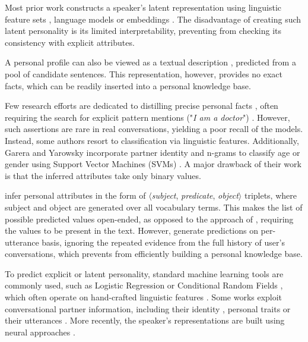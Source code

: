 Most prior work constructs a speaker's latent representation using linguistic feature sets \cite{AIIDElin11, jing-kambhatla-roukos:2007:ACLMain, garera-yarowsky:2009:ACLIJCNLP}, language models \cite{song2019learning} or embeddings \cite{luo2019learning, li2016persona}. The disadvantage of creating such latent personality is its limited interpretability, preventing from checking its consistency with explicit attributes.

A personal profile can also be viewed as a textual description \cite{zhang2018personalizing}, predicted from a pool of candidate sentences. This representation, however, provides no exact facts, which can be readily inserted into a personal knowledge base.

Few research efforts are dedicated to distilling precise personal facts \cite{dial7, welch2019look, garera-yarowsky:2009:ACLIJCNLP}, often requiring the search for explicit pattern mentions ("\textit{I am a doctor}") \cite{dial7}. However, such assertions are rare in real conversations, yielding a poor recall of the models. Instead, some authors resort to classification \cite{AIIDElin11, garera-yarowsky:2009:ACLIJCNLP} via linguistic features. Additionally, Garera and Yarowsky incorporate partner identity and n-grams to classify age or gender using Support Vector Machines (SVMs) \cite{garera-yarowsky:2009:ACLIJCNLP}. A major drawback of their work is that the inferred attributes take only binary values.

\citet{wu2019getting} infer personal attributes in the form of $\langle$\textit{subject}, \textit{predicate}, \textit{object}$\rangle$ triplets, where subject and object are generated over all vocabulary terms. This makes the list of possible predicted values open-ended, as opposed to the approach of \citet{dial7}, requiring the values to be present in the text. However, \citet{wu2019getting} generate predictions on per-utterance basis, ignoring the repeated evidence from the full history of user's conversations, which prevents from efficiently building a personal knowledge base.

To predict explicit or latent personality, standard machine learning tools are commonly used, such as Logistic Regression \cite{azab2019representing} or Conditional Random Fields \cite{li2016persona}, which often operate on hand-crafted linguistic features \cite{garera-yarowsky:2009:ACLIJCNLP}. Some works exploit conversational partner information, including their identity \cite{azab2019representing}, personal traits \cite{garera-yarowsky:2009:ACLIJCNLP} or their utterances \cite{welch2019look}. More recently, the speaker's representations are built using neural approaches \cite{zhang2018personalizing, pers2, luo2019learning, welch2019look}.

